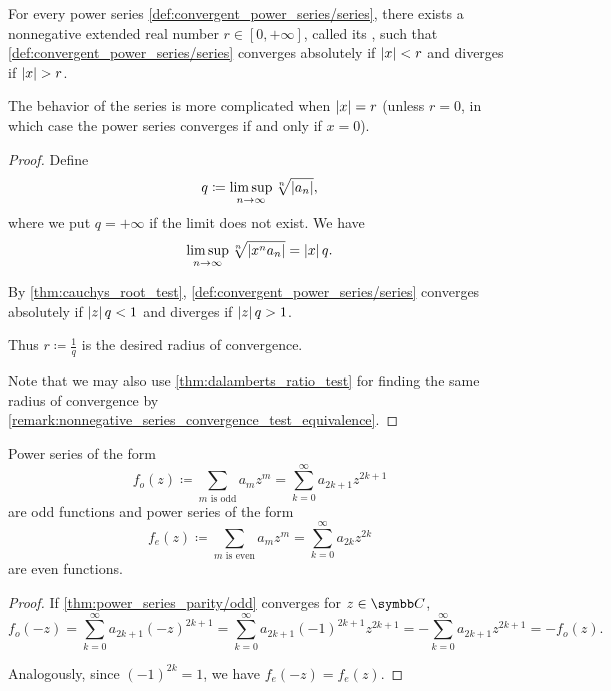 \begin{theorem}\label{thm:power_series_radius_of_convergence}
  For every power series \cref{def:convergent_power_series/series}, there exists a nonnegative extended real number \( r \in [0, +\infty] \), called its , such that \cref{def:convergent_power_series/series} converges absolutely if \( \left\vert x \right\vert < r \) and diverges if \( \left\vert x \right\vert > r \).

  The behavior of the series is more complicated when \( \left\vert x \right\vert = r \) (unless \( r = 0 \), in which case the power series converges if and only if \( x = 0 \)).
\end{theorem}
\begin{proof}
  Define
  \begin{equation*}
    q \coloneqq \limsup_{n \to \infty} \sqrt[n]{\left\vert a_n \right\vert},
  \end{equation*}
  where we put \( q = +\infty \) if the limit does not exist. We have
  \begin{equation*}
    \limsup_{n \to \infty} \sqrt[n]{\left\vert x^n a_n \right\vert} = \left\vert x \right\vert q.
  \end{equation*}

  By \cref{thm:cauchys_root_test}, \cref{def:convergent_power_series/series} converges absolutely if \( \left\vert z \right\vert q < 1 \) and diverges if \( \left\vert z \right\vert q > 1 \).

  Thus \( r \coloneqq \tfrac 1 q \) is the desired radius of convergence.

  Note that we may also use \cref{thm:dalamberts_ratio_test} for finding the same radius of convergence by \cref{remark:nonnegative_series_convergence_test_equivalence}.
\end{proof}

\begin{proposition}\label{thm:power_series_parity}
  Power series of the form
  \begin{equation}\label{thm:power_series_parity/odd}
    f_o(z) \coloneqq \sum_{m \text{ is odd}} a_m z^m = \sum_{k=0}^\infty a_{2k+1} z^{2k+1}
  \end{equation}
  are odd functions and power series of the form
  \begin{equation}\label{thm:power_series_parity/even}
    f_e(z) \coloneqq \sum_{m \text{ is even}} a_m z^m = \sum_{k=0}^\infty a_{2k} z^{2k}
  \end{equation}
  are even functions.
\end{proposition}
\begin{proof}
  If \cref{thm:power_series_parity/odd} converges for \( z \in \BC \),
  \begin{equation*}
    f_o(-z)
    =
    \sum_{k=0}^\infty a_{2k+1} (-z)^{2k+1}
    =
    \sum_{k=0}^\infty a_{2k+1} (-1)^{2k+1} z^{2k+1}
    =
    - \sum_{k=0}^\infty a_{2k+1} z^{2k+1}
    =
    - f_o(z).
  \end{equation*}

  Analogously, since \( (-1)^{2k} = 1 \), we have \( f_e(-z) = f_e(z) \).
\end{proof}

